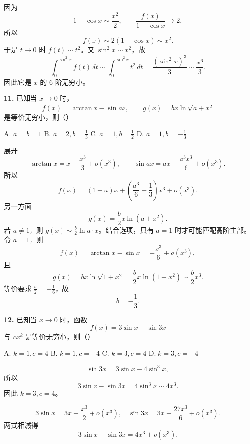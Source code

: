 \begin{solutionblock}
因为
\[
1-\cos x\sim \frac{x^2}{2},
\qquad
\frac{f(x)}{1-\cos x}\to2,
\]
所以
\[
f(x)\sim2(1-\cos x)\sim x^2.
\]
于是 \(t\to0\) 时 \(f(t)\sim t^2\)。又 \(\sin^2x\sim x^2\)，故
\[
\int_0^{\sin^2x}f(t)\,dt
\sim\int_0^{\sin^2x}t^2\,dt
=\frac{(\sin^2x)^3}{3}
\sim\frac{x^6}{3}.
\]
因此它是 \(x\) 的 6 阶无穷小。

\end{solutionblock}

\begin{problemblock}
\textbf{11.} 已知当 \(x\to0\) 时，
\[
f(x)=\arctan x-\sin ax,\qquad
g(x)=bx\ln\sqrt{a+x^2}
\]
是等价无穷小，则（\quad）

A. \(a=b=1\) \qquad B. \(a=2,b=\frac13\) \qquad C. \(a=1,b=\frac12\) \qquad D. \(a=1,b=-\frac13\)
\end{problemblock}

\begin{solutionblock}
展开
\[
\arctan x=x-\frac{x^3}{3}+o(x^3),\qquad
\sin ax=ax-\frac{a^3x^3}{6}+o(x^3).
\]
所以
\[
f(x)=(1-a)x+\left(\frac{a^3}{6}-\frac13\right)x^3+o(x^3).
\]
另一方面
\[
g(x)=\frac{b}{2}x\ln(a+x^2).
\]
若 \(a\ne1\)，则 \(g(x)\sim \frac{b}{2}\ln a\cdot x\)。结合选项，只有 \(a=1\) 时才可能匹配高阶主部。令 \(a=1\)，则
\[
f(x)=\arctan x-\sin x
=-\frac{x^3}{6}+o(x^3),
\]
且
\[
g(x)=bx\ln\sqrt{1+x^2}
=\frac{b}{2}x\ln(1+x^2)
\sim\frac{b}{2}x^3.
\]
等价要求 \(\frac{b}{2}=-\frac16\)，故
\[
b=-\frac13.
\]

\end{solutionblock}

\begin{problemblock}
\textbf{12.} 已知当 \(x\to0\) 时，函数
\[
f(x)=3\sin x-\sin3x
\]
与 \(cx^k\) 是等价无穷小，则（\quad）

A. \(k=1,c=4\) \qquad B. \(k=1,c=-4\) \qquad C. \(k=3,c=4\) \qquad D. \(k=3,c=-4\)
\end{problemblock}

\begin{solutionblock}

\[
\sin3x=3\sin x-4\sin^3x,
\]
所以
\[
3\sin x-\sin3x=4\sin^3x\sim4x^3.
\]
因此 \(k=3,c=4\)。

\[
3\sin x=3x-\frac{x^3}{2}+o(x^3),
\quad
\sin3x=3x-\frac{27x^3}{6}+o(x^3).
\]
两式相减得
\[
3\sin x-\sin3x=4x^3+o(x^3).
\]

\end{solutionblock}

